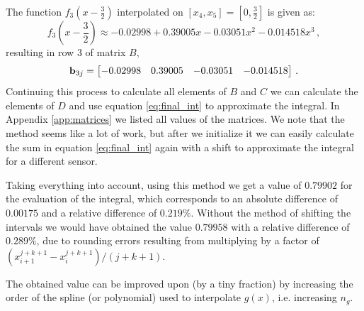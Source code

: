 The function $f_3(x-\frac{3}{2})$ interpolated on $[x_4, x_5] = [0, \frac{3}{2}]$ is given as:
\begin{equation}
    f_3\left(x-\frac{3}{2}\right) \approx -0.02998 + 0.39005 x -0.03051 x^2 -0.014518 x^3 \,, \nonumber
\end{equation}
resulting in row $3$ of matrix $B$,
\begin{equation}
    \mathbf b_{3j} = \begin{bmatrix}-0.02998 & 0.39005 & -0.03051 & -0.014518 \end{bmatrix} \,. \nonumber \\
\end{equation}
Continuing this process to calculate all elements of $B$ and $C$ we can calculate the elements of $D$ and use equation \ref{eq:final_int} to approximate the integral.
In Appendix \ref{app:matrices} we listed all values of the matrices.
We note that the method seems like a lot of work, but after we initialize it we can easily calculate the sum in equation \ref{eq:final_int} again with a shift to approximate the integral for a different sensor.

Taking everything into account, using this method we get a value of $0.79902$ for the evaluation of the integral, which corresponds to an absolute difference of $0.00175$ and a relative difference of $0.219\%$.
Without the method of shifting the intervals we would have obtained the value $0.79958$ with a relative difference of $0.289\%$, due to rounding errors resulting from multiplying by a factor of $(x_{i+1}^{j+k+1} - x_i^{j+k+1})/(j+k+1)$.

The obtained value can be improved upon (by a tiny fraction) by increasing the order of the spline (or polynomial) used to interpolate $g(x)$, i.e. increasing $n_g$.
